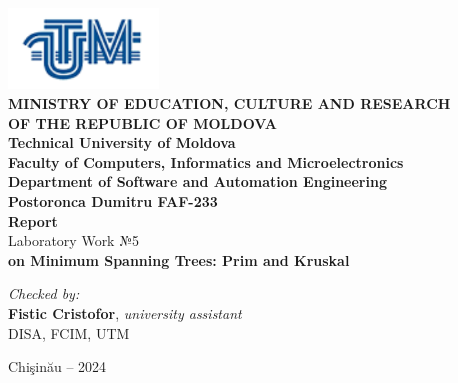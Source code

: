 \documentclass[12pt]{article}
\begin{document}
\begin{titlepage}
\begin{center}
    \includegraphics[width=0.3\textwidth]{image.png} \\[0.2cm]
    
    \textbf{MINISTRY OF EDUCATION, CULTURE AND RESEARCH \\
    OF THE REPUBLIC OF MOLDOVA} \\[0.3cm]
    
    \textbf{Technical University of Moldova \\
    Faculty of Computers, Informatics and Microelectronics \\
    Department of Software and Automation Engineering} \\[2cm]
    
    \textbf{Postoronca Dumitru FAF-233}\\[0.5cm]
    
    \Huge \textbf{Report} \\[0.5cm]
    
    \large Laboratory Work №5\\[0.5cm]
    
    \textbf{on Minimum Spanning Trees: Prim and Kruskal} \\[3cm]
    
    \begin{flushright}
        \textit{Checked by:} \\
        \textbf{Fistic Cristofor}, \textit{university assistant} \\
        DISA, FCIM, UTM
    \end{flushright}
    
    \vfill
    
    Chi{\c{s}}in{\u{a}}u -- 2024
\end{center}
\end{titlepage}

\newpage
\setcounter{page}{1}
\pagestyle{fancy}
\fancyhf{}
\rhead{\thepage}
\end{document}
